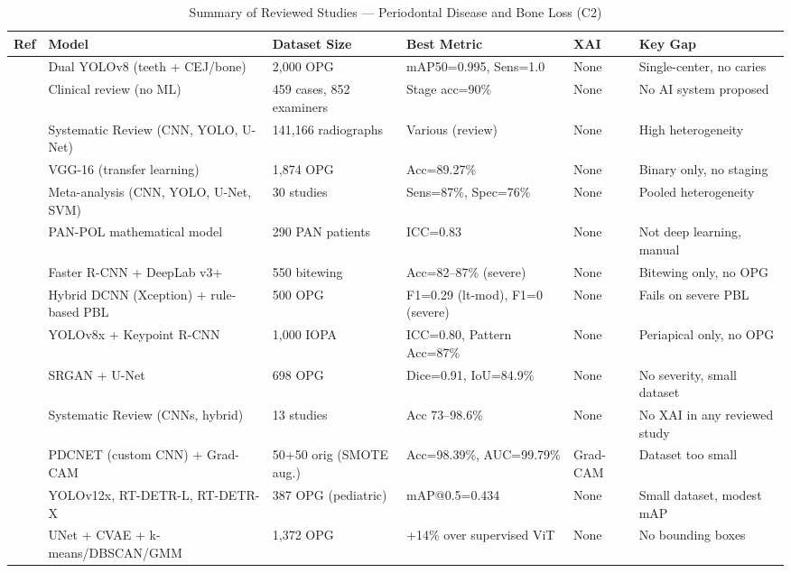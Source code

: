 \documentclass[conference]{IEEEtran}
\begin{document}
\begin{table}[t]
\caption{Summary of Reviewed Studies --- Periodontal Disease and Bone Loss (C2)}
\label{tab:c2}
\centering
\small
\begin{tabular}{p{0.6cm} p{4.5cm} p{3.0cm} p{3.8cm} p{1.0cm} p{2.8cm}}
\toprule
\textbf{Ref} & \textbf{Model} & \textbf{Dataset Size} & \textbf{Best Metric} & \textbf{XAI} & \textbf{Key Gap} \\
\midrule
\cite{jundaeng2025advanced}  & Dual YOLOv8 (teeth + CEJ/bone) & 2,000 OPG & mAP50=0.995, Sens=1.0 & None & Single-center, no caries \\
\cite{chmielewski20252018}   & Clinical review (no ML) & 459 cases, 852 examiners & Stage acc=90\% & None & No AI system proposed \\
\cite{iacob2025automated}    & Systematic Review (CNN, YOLO, U-Net) & 141,166 radiographs & Various (review) & None & High heterogeneity \\
\cite{mathur2025comparative} & VGG-16 (transfer learning) & 1,874 OPG & Acc=89.27\% & None & Binary only, no staging \\
\cite{khubrani2025detection} & Meta-analysis (CNN, YOLO, U-Net, SVM) & 30 studies & Sens=87\%, Spec=76\% & None & Pooled heterogeneity \\
\cite{tian2025development}   & PAN-POL mathematical model & 290 PAN patients & ICC=0.83 & None & Not deep learning, manual \\
\cite{lee2025evaluation}     & Faster R-CNN + DeepLab v3+ & 550 bitewing & Acc=82--87\% (severe) & None & Bitewing only, no OPG \\
\cite{cerda2024determining}  & Hybrid DCNN (Xception) + rule-based PBL & 500 OPG & F1=0.29 (lt-mod), F1=0 (severe) & None & Fails on severe PBL \\
\cite{wimalasiri2025ai}      & YOLOv8x + Keypoint R-CNN & 1,000 IOPA & ICC=0.80, Pattern Acc=87\% & None & Periapical only, no OPG \\
\cite{kong2024integrating}   & SRGAN + U-Net & 698 OPG & Dice=0.91, IoU=84.9\% & None & No severity, small dataset \\
\cite{ferrara2025applications}& Systematic Review (CNNs, hybrid) & 13 studies & Acc 73--98.6\% & None & No XAI in any reviewed study \\
\cite{bilal2024pdcnet}       & PDCNET (custom CNN) + Grad-CAM & 50+50 orig (SMOTE aug.) & Acc=98.39\%, AUC=99.79\% & Grad-CAM & Dataset too small \\
\cite{karamuftuo2025panoramic} & YOLOv12x, RT-DETR-L, RT-DETR-X & 387 OPG (pediatric) & mAP@0.5=0.434 & None & Small dataset, modest mAP \\
\cite{kim2024unsupervised}   & UNet + CVAE + k-means/DBSCAN/GMM & 1,372 OPG & +14\% over supervised ViT & None & No bounding boxes \\
\bottomrule
\end{tabular}
\end{table}
\end{document}
